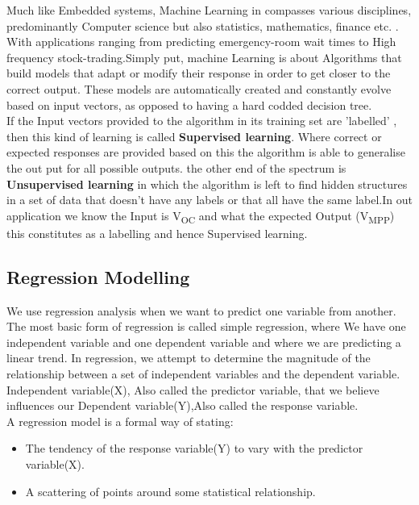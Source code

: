 {Much like Embedded systems, Machine Learning in compasses various disciplines, predominantly Computer science but also statistics, mathematics, finance etc. \cite{marsland2011machine}. With applications ranging from predicting emergency-room wait times \cite{connelly2004discrete} to High frequency stock-trading.Simply put, machine Learning is about Algorithms that build models that adapt or modify their response in order to get closer to the correct output. These models are automatically created and constantly evolve based on input vectors, as opposed to having a hard codded decision tree.\\

If the Input vectors provided to the algorithm in its training set are 'labelled' , then this kind of learning is called \textbf{Supervised learning}. Where correct or expected responses are provided based on this the algorithm is able to generalise the out put for all possible outputs. the other end of the spectrum is \textbf{Unsupervised learning} in which the algorithm is left to find hidden structures in a set of data that doesn't have any labels or that all have the same label.In out application we know the Input is V\textsubscript{OC} and what the expected Output (V\textsubscript{MPP}) this constitutes as a labelling and hence Supervised learning.
 
\subsection{Regression Modelling }

We use regression analysis when we want to predict one variable from another. The most basic form of regression is called simple regression, where We have one independent variable and one dependent variable and where we are predicting a linear trend. In regression, we attempt to determine the magnitude of the relationship between a set of independent variables and the dependent variable. Independent variable(X), Also called the predictor variable, that we believe influences our Dependent variable(Y),Also called the response variable\cite{lenarreg2006}.\\

A regression model is a formal way of stating:
\begin{itemize}
\item The tendency of the response variable(Y) to vary with the predictor variable(X).
\item A scattering of points around some statistical relationship.
\end {itemize}

}
